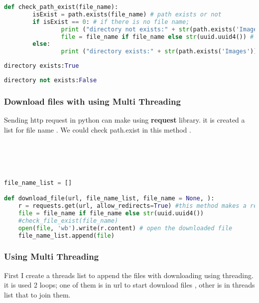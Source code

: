 \documentclass[onecolumn]{article}
\begin{document}
\begin{lstlisting}[language=Python, caption= Checking Path]
def check_path_exist(file_name): 
        isExist = path.exists(file_name) # path exists or not 
        if isExist == 0: # if there is no file name;
        		print ("directory not exists:" + str(path.exists('Images')))
                file = file_name if file_name else str(uuid.uuid4()) # random file name 
        else:
                print ("directory exists:" + str(path.exists('Images')))
\end{lstlisting}

\begin{lstlisting}[language=Python, caption= Output1]
directory exists:True
\end{lstlisting}
\begin{lstlisting}[language=Python, caption= Output2]
directory not exists:False
\end{lstlisting}

 
\subsubsection{ Download  files with  using Multi Threading }
Sending http request in python can make using \textbf{request} library. it is created a list for file name . We could check path.exist in this method . \\\\ \\\\

\begin{lstlisting}[language=Python, caption=Downloading files]

file_name_list = [] 

def download_file(url, file_name_list, file_name = None, ):
    r = requests.get(url, allow_redirects=True) #this method makes a request to a url
    file = file_name if file_name else str(uuid.uuid4())
    #check_file_exist(file_name)
    open(file, 'wb').write(r.content) # open the downloaded file
    file_name_list.append(file)
\end{lstlisting}


\subsubsection{Using Multi Threading }

First I create a threads list to append the files with downloading using threading.
 it is used 2 loops; one of them is in url to start download files , other is in threads list that  to join them.
\end{document}
